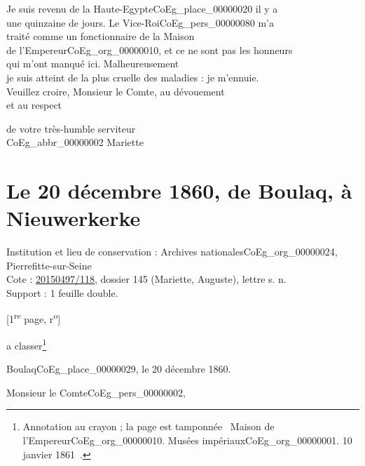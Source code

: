 \documentclass{book}
\begin{document}
\indent Je suis revenu de la Haute-Egypte\gls{CoEg_place_00000020} il y a\\
une quinzaine de jours. Le Vice-Roi\gls{CoEg_pers_00000080} m’a\\
traité comme un fonctionnaire de la Maison\\
de l’Empereur\gls{CoEg_org_00000010}, et ce ne sont pas les honneurs\\
qui m’ont manqué ici. Malheureusement\\
je suis atteint de la plus cruelle des maladies :
je m’ennuie.\\
\indent Veuillez croire, Monsieur le Comte, au dévouement\\
et au respect
\begin{center}\hspace{5cm} de votre très-humble serviteur\\
\hspace{5cm} \gls{CoEg_abbr_00000002} Mariette\end{center}
 \section*{Le 20 décembre 1860, de Boulaq, à Nieuwerkerke} \label{CoEg_Mariette_1860-12-20} 
{\footnotesize
\noindent Institution et lieu de conservation : Archives nationales\gls{CoEg_org_00000024}, Pierrefitte-sur-Seine\\
Cote : \hyperref[CoEg_Mariette_ms_001]{20150497/118}, dossier 145 (Mariette, Auguste), lettre s. n.\\
Support : 1 feuille double.
\begin{center} {[1\textsuperscript{re} page, r\textsuperscript{o}]}\end{center}}
\indent a classer\footnote{Annotation au crayon ; la page est tamponnée \og ~Maison de l’Empereur\gls{CoEg_org_00000010}. Musées impériaux\gls{CoEg_org_00000001}. 10 janvier 1861~\fg.}
\begin{flushright}Boulaq\gls{CoEg_place_00000029}, le 20 décembre 1860.\end{flushright}

\hspace{1cm} Monsieur le Comte\gls{CoEg_pers_00000002},\\
\end{document}
